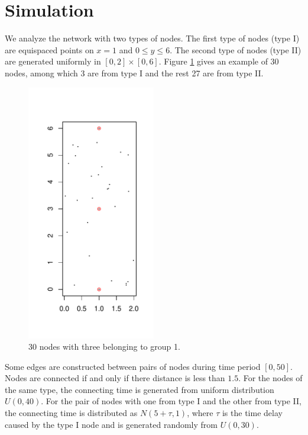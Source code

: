 
\section{Simulation}

We analyze the network with two types of nodes.
The first type of nodes (type I) are equispaced points on $x=1$ and $0\leq y\leq 6$.
The second type of nodes (type II) are generated uniformly in $[0,2]\times[0,6]$. 
Figure \ref{fig: nodes} gives an example of 30 nodes, among which 3 are from type I and the rest 27 are from type II.
\\
\begin{figure}[H]
\centering
\includegraphics[width=0.5\textwidth]{../simulation/nodes_distribution}
\caption{30 nodes with three belonging to group 1.}
\label{fig: nodes}
\end{figure}

Some edges are constructed between pairs of nodes during time period $[0,50]$.
Nodes are connected if and only if there distance is less than $1.5$.
For the nodes of the same type, the connecting time is generated from uniform distribution $U(0,40)$.
For the pair of nodes with one from type I and the other from type II, the connecting time is distributed as $N(5+\tau,1)$, where $\tau$ is the time delay caused by the type I node and is generated randomly from $U(0,30)$.

